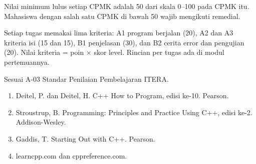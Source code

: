 \documentclass[a4paper]{article}
\begin{document}
Nilai minimum lulus setiap CPMK adalah 50 dari skala 0–100 pada CPMK itu. Mahasiswa dengan salah satu CPMK di bawah 50 wajib mengikuti remedial.

\par\vspace{4pt}\par\vspace{6pt}
Setiap tugas memakai lima kriteria: A1 program berjalan (20), A2 dan A3 kriteria isi (15 dan 15), B1 penjelasan (30), dan B2 cerita error dan pengujian (20). Nilai kriteria = poin × skor level. Rincian per tugas ada di modul pertemuannya.

\par\vspace{4pt}\par\vspace{6pt}
Sesuai A-03 Standar Penilaian Pembelajaran ITERA.

\begin{enumerate}
\item Deitel, P. dan Deitel, H. C++ How to Program, edisi ke-10. Pearson.
\item Stroustrup, B. Programming: Principles and Practice Using C++, edisi ke-2. Addison-Wesley.
\item Gaddis, T. Starting Out with C++. Pearson.
\item learncpp.com dan cppreference.com.
\end{enumerate}
\end{document}
